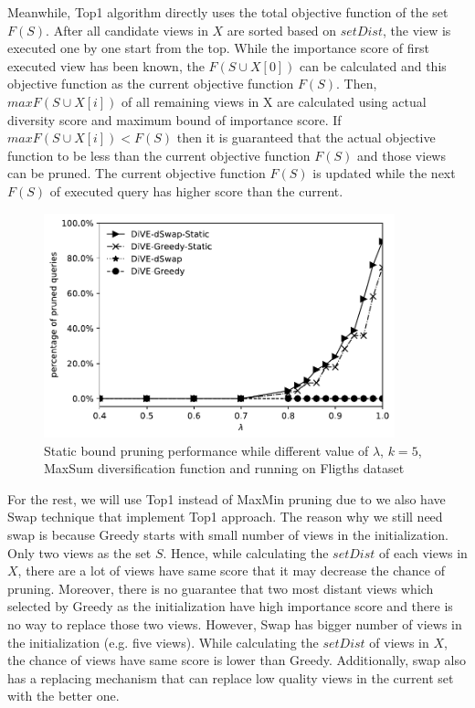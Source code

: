 \documentclass{article}
\begin{document}
Meanwhile, Top1 algorithm directly uses the total objective function of the set $ F(S) $. After all candidate views in $ X $ are sorted based on $ setDist $, the view is executed one by one start from the top. While the importance score of first executed view has been known, the $ F(S \cup X[0]) $ can be calculated and this objective function as the current objective function $ F(S) $. Then, $ maxF(S \cup X[i]) $ of all remaining views in X are calculated using actual diversity score and maximum bound of importance score. If $ maxF(S \cup X[i]) < F(S) $ then it is guaranteed that the actual objective function to be less than the current objective function $ F(S) $ and those views can be pruned. The current objective function $  F(S) $ is updated while the next $ F(S) $ of executed query has higher score than the current.
\begin{figure}
	\begin{center}
		\includegraphics[width=4.0in]{figures/no_pruning_vs_static_extend}
		\vspace{-12pt}
		\caption{Static bound pruning performance while different value of $\lambda$, $k = 5$, MaxSum diversification function and running on Fligths dataset}
		\label{fig:static-pruning}
		\vspace{-20pt}
	\end{center}
\end{figure}

For the rest, we will use Top1 instead of MaxMin pruning due to we also have Swap technique that implement Top1 approach. The reason why we still need swap is because Greedy starts with small number of views in the initialization. Only two views as the set $ S $. Hence, while calculating the $ setDist $ of each views in $ X $, there are a lot of views have same score that it may decrease the chance of pruning. Moreover, there is no guarantee that two most distant views which selected by Greedy as the initialization have high importance score and there is no way to replace those two views. However, Swap has bigger number of views in the initialization (e.g. five views). While calculating the $ setDist $ of views in $ X $, the chance of views have same score is lower than Greedy. Additionally, swap also has a replacing mechanism that can replace low quality views in the current set with the better one. 
\end{document}
